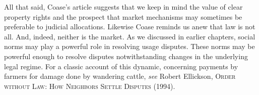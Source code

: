 All that said, Coase's article suggests that we keep in mind the value of clear
property rights and the prospect that market mechanisms may sometimes be
preferable to judicial allocations. Likewise Coase reminds us anew that law is
not all. And, indeed, neither is the market. As we discussed in earlier
chapters, social norms may play a powerful role in resolving usage disputes.
These norms may be powerful enough to resolve disputes notwithstanding changes
in the underlying legal regime. For a classic account of this dynamic,
concerning payments by farmers for damage done by wandering cattle, \textit{see}
Robert Ellickson, \textsc{Order without Law: How Neighbors Settle Disputes}
(1994). 

